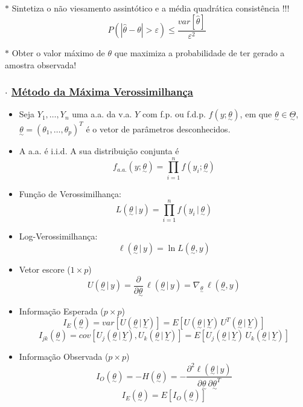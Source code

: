 \documentclass[11pt,a4paper]{article}
\newcommand{\vt}[1]{\underset{\sim}{#1}}      %
\begin{document}
\medskip
$\ast$ Sintetiza o não viesamento assintótico e a média quadrática consistência !!!
\[ P(|\hat{\theta}-\theta|>\varepsilon) \leq \frac{var[\hat{\theta}]}{\varepsilon^2} \]

\medskip
$\ast$ Obter o valor máximo de $\theta$ que maximiza a probabilidade de ter gerado a amostra observada!

\subsubsection*{$\cdot$ \underline{Método da Máxima Verossimilhança}}
\begin{itemize}
  \item Seja $Y_1,\ldots,Y_n$ uma a.a. da v.a. $Y$ com f.p. ou f.d.p. $f(y;\vt{\theta})$, em que $\vt{\theta}\in\vt{\Theta}$, \\
  $\vt{\theta} = (\theta_1,\ldots,\theta_p)^T$ é o vetor de parâmetros desconhecidos.
  \item A a.a. é i.i.d. A sua distribuição conjunta é
  \[ f_{a.a.}(y;\vt{\theta}) = \prod_{i=1}^{n} f(y_i;\vt{\theta}) \]
  \item Função de Verossimilhança:
  \[ L(\vt{\theta}\,|\,y) = \prod_{i=1}^{n} f(y_i\,|\,\vt{\theta}) \]
  \item Log-Verossimilhança:
  \[ \ell(\vt{\theta}\,|\,y) = \ln L(\vt{\theta},y) \]
  \item Vetor escore ($1\times p$)
  \[ U(\vt{\theta}\,|\,y) = \frac{\partial}{\partial\vt{\theta}}\,\ell(\vt{\theta}\,|\,y) = \nabla_{\vt{\theta}}\,\ell(\vt{\theta},y) \]
  \item Informação Esperada ($p\times p$)
  \[ I_E(\vt{\theta}) = var[U(\vt{\theta}\,|\,\vt{Y})] = E[U(\vt{\theta}\,|\,\vt{Y})\,U^T(\vt{\theta}\,|\,\vt{Y})] \]
  \[ I_{jk}(\vt{\theta}) = cov[U_j(\vt{\theta}\,|\,\vt{Y}),U_k(\vt{\theta}\,|\,\vt{Y})] = E[U_j(\vt{\theta}\,|\,\vt{Y})\,U_k(\vt{\theta}\,|\,\vt{Y})] \]
  \item Informação Observada ($p\times p$)
  \[ I_O(\vt{\theta}) = -H(\vt{\theta}) = -\frac{\partial^2\ell(\vt{\theta}\,|\,y)}{\partial\vt{\theta}\,\partial\vt{\theta}^T} \]
  \[ I_E(\vt{\theta}) = E[I_O(\vt{\theta})] \]
\end{itemize}

\end{document}
